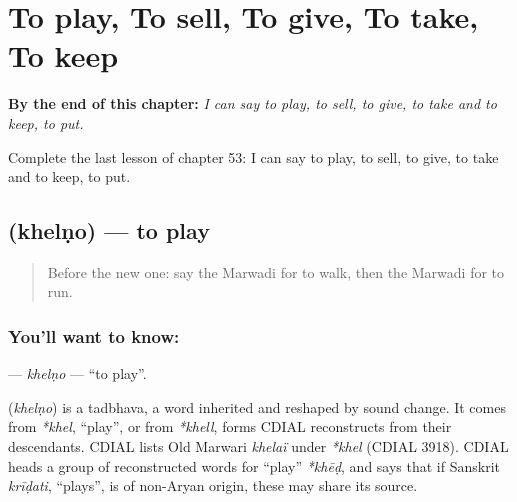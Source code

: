 
\chapter{To play, To sell, To give, To take, To keep}
\label{ch:mw-to-play-to-sell-to-give-to-take-to-keep}

\begin{chapteropening}
\textbf{By the end of this chapter:} \emph{I can say to play, to sell, to give, to take and to keep, to put.}

Complete the last lesson of chapter 53: I can say to play, to sell, to give, to take and to keep, to put.
\end{chapteropening}

\section[\texorpdfstring{\mw{खेलणो} (khelṇo)}{खेलणो (khelṇo)}]{ (khelṇo) — to play}

\label{lesson:MW-C53-khelno}



\begin{quote}
Before the new one: say the Marwadi for to walk, then the Marwadi for to run.
\end{quote}

\subsection*{You'll want to know: }
\textbf{} — \emph{khelṇo} — \textquotedblleft{}to play\textquotedblright{}.

\begin{cousinweb}
\textbf{} (\emph{khelṇo}) is a tadbhava, a word inherited and reshaped by sound change. It comes from \emph{*khel}, \textquotedblleft{}play\textquotedblright{}, or from \emph{*khell}, forms CDIAL reconstructs from their descendants. CDIAL lists Old Marwari \emph{khelaï} under \emph{*khel} (CDIAL 3918). CDIAL heads a group of reconstructed words for \textquotedblleft{}play\textquotedblright{} \emph{*khēḍ}, and says that if Sanskrit \emph{krīḍati}, \textquotedblleft{}plays\textquotedblright{}, is of non-Aryan origin, these may share its source.
\end{cousinweb}

